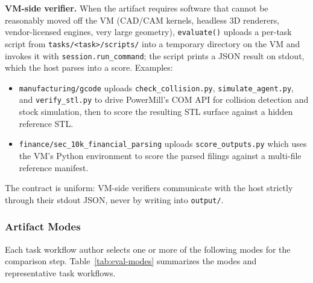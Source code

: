 \noindent \textbf{VM-side verifier.}
When the artifact requires software that cannot be reasonably moved off the VM (CAD/CAM kernels, headless 3D renderers, vendor-licensed engines, very large geometry), \texttt{evaluate()} uploads a per-task script from \texttt{tasks/<task>/scripts/} into a temporary directory on the VM and invokes it with \texttt{session.run\_command}; the script prints a JSON result on stdout, which the host parses into a score. Examples:
\begin{itemize}[nosep,leftmargin=1.2em]
    \item \texttt{manufacturing/gcode} uploads \texttt{check\_collision.py}, \texttt{simulate\_agent.py}, and \texttt{verify\_stl.py} to drive PowerMill's COM API for collision detection and stock simulation, then to score the resulting STL surface against a hidden reference STL.
    \item \texttt{finance/sec\_10k\_financial\_parsing} uploads \texttt{score\_outputs.py} which uses the VM's Python environment to score the parsed filings against a multi-file reference manifest.
\end{itemize}
The contract is uniform: VM-side verifiers communicate with the host strictly through their stdout JSON, never by writing into \texttt{output/}.

\subsubsection{Artifact Modes}
\label{app:eval-modes}

Each task workflow author selects one or more of the following modes for the comparison step. Table~\ref{tab:eval-modes} summarizes the modes and representative task workflows.

